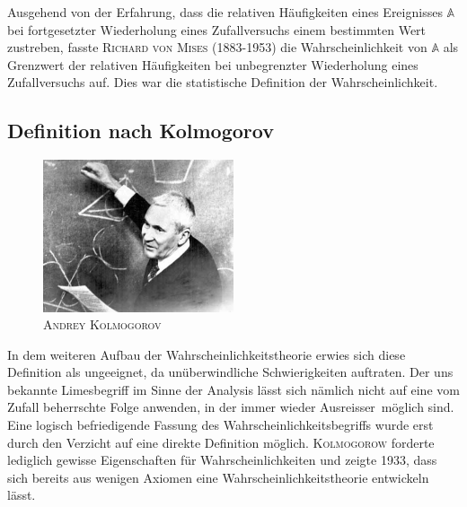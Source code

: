 \documentclass[%
<<<<<<< Updated upstream
<<<<<<< Updated upstream
11pt,%
twoside,%
titlepage,%
german,%
=======
=======
>>>>>>> Stashed changes
11pt,%
twoside,%
titlepage,%
swissgerman,%
<<<<<<< Updated upstream
>>>>>>> Stashed changes
=======
>>>>>>> Stashed changes
headsepline%
]{scrartcl}
\theoremstyle{definition}
\theoremstyle{plain}
\newcounter{theo}[section]\setcounter{theo}{0}
\begin{document}
Ausgehend von der Erfahrung, dass die relativen Häufigkeiten eines Ereignisses $\mathbb{A}$ bei fortgesetzter Wiederholung eines Zufallversuchs einem bestimmten Wert zustreben, fasste \textsc{Richard von Mises} (1883-1953) die Wahrscheinlichkeit von $\mathbb{A}$ als Grenzwert der relativen Häufigkeiten bei unbegrenzter Wiederholung eines Zufallversuchs auf. Dies war die statistische Definition der Wahrscheinlichkeit.

\subsection{Definition nach Kolmogorov}

\begin{figure}
\centering
\includegraphics[width=0.5\textwidth]{pictures/kolmogorov}
\caption{\textsc{Andrey Kolmogorov}}
\end{figure}

In dem weiteren Aufbau der Wahrscheinlichkeitstheorie erwies sich diese Definition als ungeeignet, da unüberwindliche Schwierigkeiten auftraten. Der uns bekannte Limesbegriff im Sinne der Analysis lässt sich nämlich nicht auf eine vom Zufall beherrschte Folge anwenden, in der immer wieder \glqq Ausreisser\grqq\ möglich sind. Eine logisch befriedigende Fassung des Wahrscheinlichkeitsbegriffs wurde erst durch den Verzicht auf eine direkte Definition möglich. \textsc{Kolmogorow} forderte lediglich gewisse Eigenschaften für Wahrscheinlichkeiten und zeigte 1933, dass sich bereits aus wenigen Axiomen eine Wahrscheinlichkeitstheorie entwickeln lässt.
\end{document}
